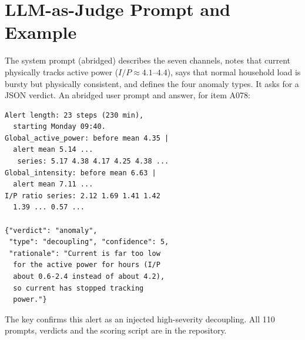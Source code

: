 \documentclass[11pt]{article}
\begin{document}
\section{LLM-as-Judge Prompt and Example}
\label{app:judge}
The system prompt (abridged) describes the seven channels, notes that current physically tracks active power ($I/P \approx 4.1$--$4.4$), says that normal household load is bursty but physically consistent, and defines the four anomaly types. It asks for a JSON verdict. An abridged user prompt and answer, for item A078:
{\scriptsize
\begin{verbatim}
Alert length: 23 steps (230 min),
  starting Monday 09:40.
Global_active_power: before mean 4.35 |
  alert mean 5.14 ...
   series: 5.17 4.38 4.17 4.25 4.38 ...
Global_intensity: before mean 6.63 |
  alert mean 7.11 ...
I/P ratio series: 2.12 1.69 1.41 1.42
  1.39 ... 0.57 ...

{"verdict": "anomaly",
 "type": "decoupling", "confidence": 5,
 "rationale": "Current is far too low
  for the active power for hours (I/P
  about 0.6-2.4 instead of about 4.2),
  so current has stopped tracking
  power."}
\end{verbatim}}
\noindent The key confirms this alert as an injected high-severity decoupling. All 110 prompts, verdicts and the scoring script are in the repository.
\end{document}
